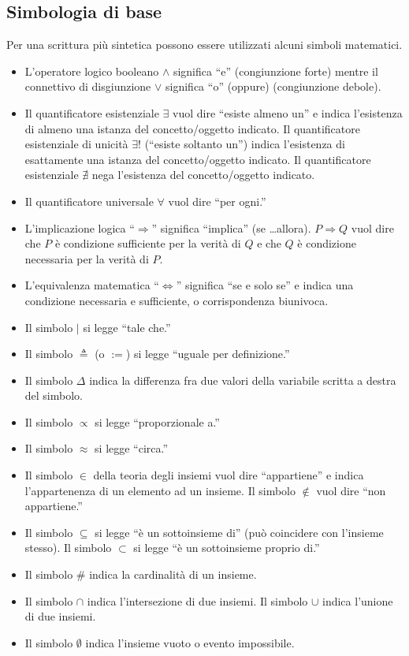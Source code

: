 \subsection*{Simbologia di base}

Per una scrittura più sintetica possono essere utilizzati alcuni simboli matematici.

\begin{itemize}
\item L'operatore logico booleano $\land$ significa ``e'' (congiunzione forte) mentre il  connettivo di disgiunzione $\lor$ significa ``o'' (oppure) (congiunzione debole).
\item Il quantificatore esistenziale $\exists$ vuol dire ``esiste almeno un'' e indica 
l'esistenza di almeno una istanza del concetto/oggetto indicato. Il quantificatore 
esistenziale di unicità $\exists!$ (``esiste soltanto un'') indica l'esistenza di 
esattamente una istanza del concetto/oggetto indicato. Il quantificatore esistenziale 
$\nexists$ nega l'esistenza del concetto/oggetto indicato.
\item Il quantificatore universale $\forall$ vuol dire ``per ogni.''
\item L'implicazione logica ``$\Rightarrow$'' significa ``implica'' (se \dots allora). $P \Rightarrow Q$ vuol dire che $P$ è condizione sufficiente per la verità di $Q$ e che $Q$ è condizione necessaria per la verità di $P$. 
\item L'equivalenza matematica ``$\iff$'' significa ``se e solo se'' e indica una condizione necessaria e sufficiente, o corrispondenza biunivoca.
\item Il simbolo $\vert$ si legge ``tale che.''
\item Il simbolo $\triangleq$ (o $:=$) si legge ``uguale per definizione.'' 
\item Il simbolo $\Delta$ indica la differenza fra due valori della variabile scritta a destra del simbolo. 
\item Il simbolo $\propto$ si legge ``proporzionale a.''
\item Il simbolo $\approx$ si legge ``circa.''
\item Il simbolo $\in$ della teoria degli insiemi vuol dire ``appartiene'' e indica l'appartenenza di un elemento ad un insieme. Il simbolo $\notin$ vuol dire ``non appartiene.''
\item Il simbolo $\subseteq$ si legge ``è un sottoinsieme di'' (può coincidere con l'insieme stesso). Il simbolo $\subset$ si legge ``è un sottoinsieme proprio di.'' 
\item Il simbolo $\#$ indica la cardinalità di un insieme.
\item Il simbolo $\cap$ indica l'intersezione di due insiemi. Il simbolo $\cup$ indica l'unione di due insiemi.
\item Il simbolo $\emptyset$ indica l'insieme vuoto o evento impossibile.
\end{itemize}

